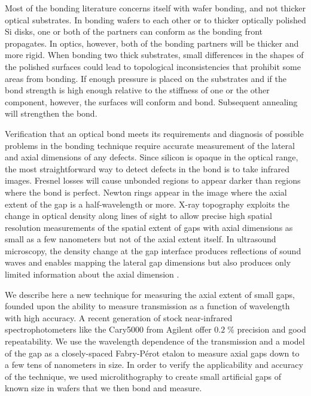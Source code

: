 \documentclass[osajnl,twocolumn,showpacs,superscriptaddress,11pt]{revtex4-1} %
\begin{document}
Most of the bonding literature concerns itself with wafer bonding, and not thicker optical substrates.  In bonding wafers to each other or to thicker optically polished Si disks, one or both of the partners can conform as the bonding front propagates.  In optics, however, both of the bonding partners will be thicker and more rigid.  When bonding two thick substrates, small differences in the shapes of the polished surfaces could lead to topological inconsistencies that prohibit some areas from bonding.  If enough pressure is placed on the substrates and if the bond strength is high enough relative to the stiffness of one or the other component, however, the surfaces will conform and bond.  Subsequent annealing will strengthen the bond.


Verification that an optical bond meets its requirements and diagnosis of possible problems in the bonding technique require accurate measurement of the lateral and axial dimensions of any defects.  Since silicon is opaque in the optical range, the most straightforward way to detect defects in the bond is to take infrared images.  Fresnel losses will cause unbonded regions to appear darker than regions where the bond is perfect.  Newton rings appear in the image where the axial extent of the gap is a half-wavelength or more.  X-ray topography \cite{Mitani1990} exploits the change in optical density along lines of sight to allow precise high spatial resolution measurements of the spatial extent of gaps with axial dimensions as small as a few nanometers but not of the axial extent itself. In ultrasound microscopy, the density change at the gap interface produces reflections of sound waves and enables mapping the lateral gap dimensions but also produces only limited information about the axial dimension \cite{2000RScI...71.1869G}.


We describe here a new technique for measuring the axial extent of small gaps, founded upon the ability to measure transmission as a function of wavelength with high accuracy.   A recent generation of stock near-infrared spectrophotometers like the Cary5000 from Agilent offer $0.2\;\%$ precision and good repeatability.  We use the wavelength dependence of the transmission and a model of the gap as a closely-spaced Fabry-P\'{e}rot etalon to measure axial gaps down to a few tens of nanometers in size.  In order to verify the applicability and accuracy of the technique, we used microlithography to create small artificial gaps of known size in wafers that we then bond and measure.
\end{document}
